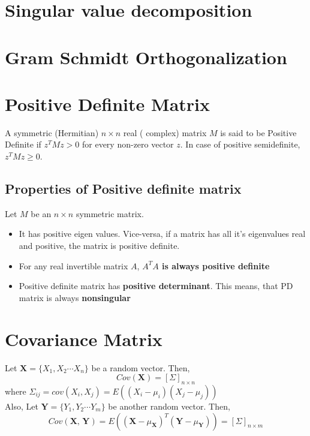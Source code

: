 \documentclass[12pt]{article}
\begin{document}
	\section{Singular value decomposition}
	\section{Gram Schmidt Orthogonalization}
	\section{Positive Definite Matrix}
	
		A symmetric (Hermitian) $n \times n$ real ( complex) matrix $M$ is said to be Positive Definite if $z^TMz > 0$ for every non-zero vector $z$. In case of positive semidefinite, $z^TMz \ge 0$. 
		
		\subsection{Properties of Positive definite matrix}
			Let $M$ be an $n \times n$ symmetric matrix.
			\begin{itemize}
				\item It has positive eigen values. Vice-versa, if a matrix has all it's eigenvalues real and positive, the matrix is positive definite. 
				\item For any real invertible matrix $A$, \textbf{$A^{T}A$ is always positive definite}
				\item Positive definite matrix has \textbf{positive determinant}. This means, that PD matrix is always \textbf{nonsingular}
			\end{itemize}
	\section{Covariance Matrix}
	
		Let $\textbf{X} = \{X_1, X_2 \cdots X_n\}$ be a random vector. Then, 
		\begin{equation}
		Cov(\textbf{X}) = [\Sigma]_{n \times n} 
		\end{equation}
		where $\Sigma_{ij} = cov(X_i, X_j) = E((X_i - \mu_i)(X_j - \mu_j))$
		\\
		Also, Let $\textbf{Y} = \{Y_1, Y_2 \cdots Y_m\}$ be another random vector. Then, 
		\begin{equation}
			Cov(\textbf{X, Y}) = E({(\textbf{X} - \mu_\textbf{X})}^T(\textbf{Y} - \mu_\textbf{Y})) = [\Sigma]_{n \times m}
		\end{equation}
	
\end{document}
